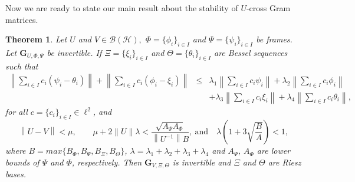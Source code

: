 \documentclass{birkjour}
\newtheorem{thm}{Theorem}[section]
\theoremstyle{definition}
\theoremstyle{remark}
\numberwithin{equation}{section}
\newcommand{\BL}[1]{
{\mathcal B} \left( #1 \right)
}
\begin{document}
Now we are ready to state our main result about the stability of
$U$-cross Gram matrices.
\begin{thm}
Let $U$ and $V\in \BL{\mathcal{H}},$  $\Phi=\{\phi_{i}\}_{i\in I}$ and $\Psi=\{\psi_{i}\}_{i\in I}$
be frames. Let
$\mathbf{G}_{U,\Phi,\Psi}$ be invertible. If
$\Xi=\{\xi_{i}\}_{i\in I}$ and $\Theta=\{\theta_{i}\}_{i\in I}$
are Bessel sequences such that
\begin{eqnarray}\label{shart1}
\left\|\sum_{i\in I}c_{i}\left(\psi_{i}-\theta_{i}\right)\right\|+\left\|\sum_{i\in I}c_{i}\left(\phi_{i}-\xi_{i}\right)\right\|&\leq&\lambda_{1}\left\|\sum_{i\in I}c_{i}\psi_{i}\right\|
+\lambda_{2}\left\|\sum_{i\in I}c_{i}\phi_{i}\right\|\\  
&&+\lambda_{3}\left\|\sum_{i\in I}c_{i}\xi_{i}\right\|+\lambda_{4}\left\|\sum_{i\in I}c_{i}\theta_{i}\right\|, \nonumber 
\end{eqnarray} 
 for all $c=\{c_{i}\}_{i\in I}\in \ell^{2}$, and
\begin{equation}\label{shart2}
\left\|U-V\right\|<\mu,\qquad \mu+2\|U\|\lambda<\frac{\sqrt{A_{\Psi}A_{\Phi}}}{\left\|U^{-1}\right\|B}, \  \text{and}\quad
\lambda\left(1+3\sqrt{\frac{B}{A}}\right)<1,
\end{equation}
where $B=max\{B_{\Phi},B_{\Psi},B_{\Xi},B_{\Theta}\}$,
$\lambda=\lambda_{1}+\lambda_{2}+\lambda_{3}+\lambda_{4}$ and
$A_{\Psi}$, $A_{\Phi}$ are lower bounds of $\Psi$ and $\Phi$,
respectively. Then $\mathbf{G}_{V,\Xi,\Theta}$ is invertible and
$\Xi$ and $\Theta$ are Riesz bases.
\end{thm}
\end{document}
